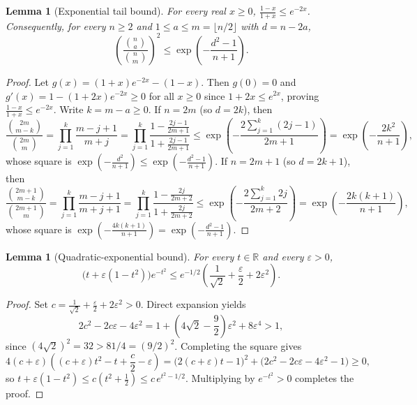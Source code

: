 \documentclass[11pt]{article}
\newtheorem{lemma}[theorem]{Lemma}
\begin{document}
\begin{lemma}[Exponential tail bound]\label{lem:tail}
For every real $x \ge 0$, $\frac{1-x}{1+x} \le e^{-2x}$. Consequently, for every $n \ge 2$ and $1 \le a \le m = \lfloor n/2 \rfloor$ with $d = n - 2a$,
\[
\left(\frac{\binom{n}{a}}{\binom{n}{m}}\right)^2 \le \exp\!\left(-\frac{d^2 - 1}{n + 1}\right).
\]
\end{lemma}
\begin{proof}
Let $g(x) = (1+x)e^{-2x} - (1-x)$. Then $g(0) = 0$ and $g'(x) = 1 - (1+2x)e^{-2x} \ge 0$ for all $x \ge 0$ since $1+2x \le e^{2x}$, proving $\frac{1-x}{1+x} \le e^{-2x}$. Write $k = m - a \ge 0$. If $n = 2m$ (so $d = 2k$), then
\[
\frac{\binom{2m}{m-k}}{\binom{2m}{m}} = \prod_{j=1}^k \frac{m-j+1}{m+j} = \prod_{j=1}^k \frac{1 - \frac{2j-1}{2m+1}}{1 + \frac{2j-1}{2m+1}} \le \exp\!\left(-\frac{2\sum_{j=1}^k(2j-1)}{2m+1}\right) = \exp\!\left(-\frac{2k^2}{n+1}\right),
\]
whose square is $\exp\!\left(-\frac{d^2}{n+1}\right) \le \exp\!\left(-\frac{d^2-1}{n+1}\right)$. If $n = 2m+1$ (so $d = 2k+1$), then
\[
\frac{\binom{2m+1}{m-k}}{\binom{2m+1}{m}} = \prod_{j=1}^k \frac{m-j+1}{m+j+1} = \prod_{j=1}^k \frac{1 - \frac{2j}{2m+2}}{1 + \frac{2j}{2m+2}} \le \exp\!\left(-\frac{2\sum_{j=1}^k 2j}{2m+2}\right) = \exp\!\left(-\frac{2k(k+1)}{n+1}\right),
\]
whose square is $\exp\!\left(-\frac{4k(k+1)}{n+1}\right) = \exp\!\left(-\frac{d^2-1}{n+1}\right)$.
\end{proof}

\begin{lemma}[Quadratic-exponential bound]\label{lem:quad}
For every $t \in \mathbb{R}$ and every $\varepsilon > 0$,
\[
\bigl(t + \varepsilon(1 - t^2)\bigr)e^{-t^2} \le e^{-1/2}\left(\frac{1}{\sqrt{2}} + \frac{\varepsilon}{2} + 2\varepsilon^2\right).
\]
\end{lemma}
\begin{proof}
Set $c = \frac{1}{\sqrt{2}} + \frac{\varepsilon}{2} + 2\varepsilon^2 > 0$. Direct expansion yields
\[
2c^2 - 2c\varepsilon - 4\varepsilon^2 = 1 + \left(4\sqrt{2} - \frac{9}{2}\right)\varepsilon^2 + 8\varepsilon^4 > 1,
\]
since $(4\sqrt{2})^2 = 32 > 81/4 = (9/2)^2$. Completing the square gives
\[
4(c+\varepsilon)\!\left((c+\varepsilon)t^2 - t + \frac{c}{2} - \varepsilon\right) = \bigl(2(c+\varepsilon)t - 1\bigr)^2 + \bigl(2c^2 - 2c\varepsilon - 4\varepsilon^2 - 1\bigr) \ge 0,
\]
so $t + \varepsilon(1-t^2) \le c(t^2 + \frac{1}{2}) \le c\,e^{t^2 - 1/2}$. Multiplying by $e^{-t^2} > 0$ completes the proof.
\end{proof}
\end{document}
